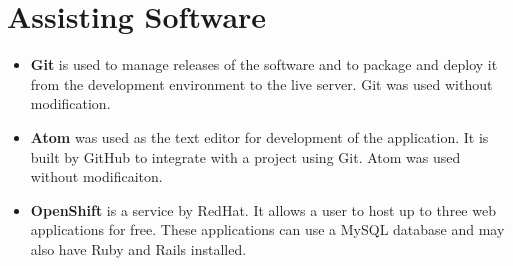 \section{Assisting Software}
\begin{itemize}
	\item \textbf{Git} \cite{Git} is used to manage releases of the software and to package and deploy it from the development environment to the live server. Git was used without modification.
	\item \textbf{Atom} \cite{Atom} was used as the text editor for development of the application. It is built by GitHub to integrate with a project using Git. Atom was used without modificaiton.
	\item \textbf{OpenShift} \cite{OpenShift} is a service by RedHat. It allows a user to host up to three web applications for free. These applications can use a MySQL database and may also have Ruby and Rails installed.
\end{itemize}

